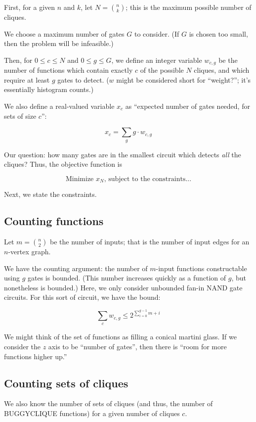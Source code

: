 \documentclass[12pt]{article}
\theoremstyle{definition}
\begin{document}
First, for a given $n$ and $k$, let $N = {n \choose k}$; this is
the maximum possible number of cliques.

We choose a maximum number of gates $G$ to consider. (If $G$ is
chosen too small, then the problem will be infeasible.)

Then, for $0 \le c \le N$ and $0 \le g \le G$,
we define an integer variable $w_{c,g}$ be the number of functions which contain
exactly $c$ of the possible $N$ cliques, and which require at least
$g$ gates to detect. ($w$ might be considered short for ``weight?'';
it's essentially histogram counts.)

We also define a real-valued variable
$x_c$ as ``expected number of gates needed, for sets of size $c$'':

\[
x_c = \sum_g g \cdot w_{c,g}
\]

Our question: how many gates are in the smallest circuit
which detects {\em all} the cliques? Thus, the objective function
is

\[
\text{Minimize }x_N\text{, subject to the constraints...}
\]

Next, we state the constraints.

\subsection{Counting functions}

Let $m = {n \choose 2}$ be the number of inputs; that is the number
of input edges for an $n$-vertex graph.

We have the counting argument: the number of $m$-input functions
constructable using $g$ gates is bounded. (This number increases
quickly as a function of $g$, but nonetheless is bounded.)
Here, we only consider unbounded fan-in NAND gate circuits. For
this sort of circuit, we have the bound:

\[
\sum_c w_{c,g} \le 2^{\sum_{i=0}^{g-1} m+i}
\]

We might think of the set of functions as filling a conical
martini glass. If we consider the $z$ axis to be ``number of gates'',
then there is ``room for more functions higher up.''

\subsection{Counting sets of cliques}

We also know the number of sets of cliques (and thus, the number
of BUGGYCLIQUE functions) for a given number of cliques $c$.
\end{document}
